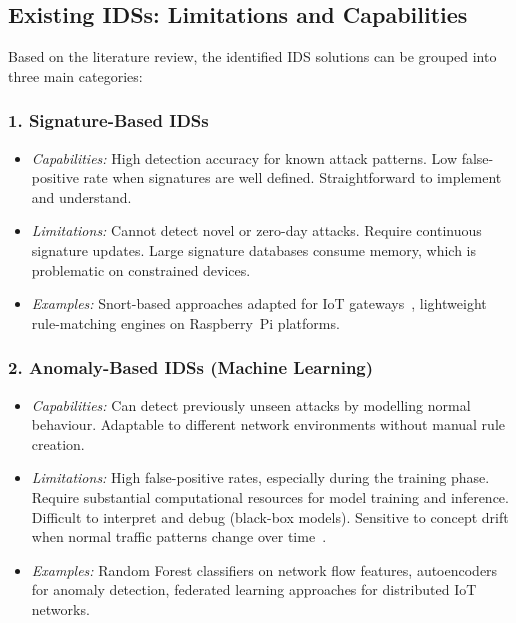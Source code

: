 \documentclass[12pt,a4paper]{article}
\begin{document}
\subsection{Existing IDSs: Limitations and Capabilities}
\label{sec:ids_review}

Based on the literature review, the identified IDS solutions can be grouped into three main categories:

\subsubsection*{1. Signature-Based IDSs}
\begin{itemize}
    \item \emph{Capabilities:} High detection accuracy for known attack patterns. Low false-positive rate when signatures are well defined. Straightforward to implement and understand.
    \item \emph{Limitations:} Cannot detect novel or zero-day attacks. Require continuous signature updates. Large signature databases consume memory, which is problematic on constrained devices.
    \item \emph{Examples:} Snort-based approaches adapted for IoT gateways~\cite{khraisat2019survey}, lightweight rule-matching engines on Raspberry~Pi platforms.
\end{itemize}

\subsubsection*{2. Anomaly-Based IDSs (Machine Learning)}
\begin{itemize}
    \item \emph{Capabilities:} Can detect previously unseen attacks by modelling normal behaviour. Adaptable to different network environments without manual rule creation.
    \item \emph{Limitations:} High false-positive rates, especially during the training phase. Require substantial computational resources for model training and inference. Difficult to interpret and debug (black-box models). Sensitive to concept drift when normal traffic patterns change over time~\cite{sommer2010outside}.
    \item \emph{Examples:} Random Forest classifiers on network flow features, autoencoders for anomaly detection, federated learning approaches for distributed IoT networks.
\end{itemize}
\end{document}

